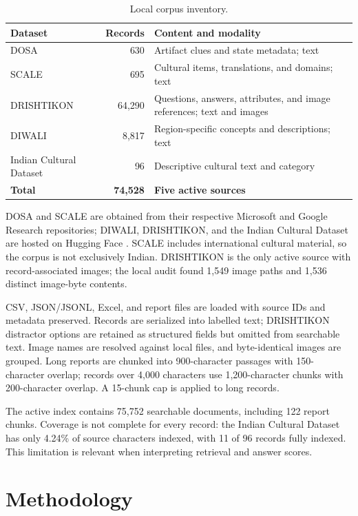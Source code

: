 \documentclass[10pt,a4paper]{article}
\begin{document}
\begin{table}[htbp]
\centering
\small
\caption{Local corpus inventory.}
\label{tab:data}
\begin{tabularx}{\linewidth}{@{}l r X@{}}
\toprule
\textbf{Dataset} & \textbf{Records} & \textbf{Content and modality}\\
\midrule
DOSA & 630 & Artifact clues and state metadata; text\\
SCALE & 695 & Cultural items, translations, and domains; text\\
DRISHTIKON & 64,290 & Questions, answers, attributes, and image references; text and images\\
DIWALI & 8,817 & Region-specific concepts and descriptions; text\\
Indian Cultural Dataset & 96 & Descriptive cultural text and category\\
\midrule
\textbf{Total} & \textbf{74,528} & \textbf{Five active sources}\\
\bottomrule
\end{tabularx}
\end{table}

DOSA and SCALE are obtained from their respective Microsoft and Google Research repositories; DIWALI, DRISHTIKON, and the Indian Cultural Dataset are hosted on Hugging Face \cite{dosa,scale,diwali,drishtikon,icd}. SCALE includes international cultural material, so the corpus is not exclusively Indian. DRISHTIKON is the only active source with record-associated images; the local audit found 1,549 image paths and 1,536 distinct image-byte contents.

CSV, JSON/JSONL, Excel, and report files are loaded with source IDs and metadata preserved. Records are serialized into labelled text; DRISHTIKON distractor options are retained as structured fields but omitted from searchable text. Image names are resolved against local files, and byte-identical images are grouped. Long reports are chunked into 900-character passages with 150-character overlap; records over 4,000 characters use 1,200-character chunks with 200-character overlap. A 15-chunk cap is applied to long records.

The active index contains 75,752 searchable documents, including 122 report chunks. Coverage is not complete for every record: the Indian Cultural Dataset has only 4.24\% of source characters indexed, with 11 of 96 records fully indexed. This limitation is relevant when interpreting retrieval and answer scores.

\section{Methodology}
\end{document}
